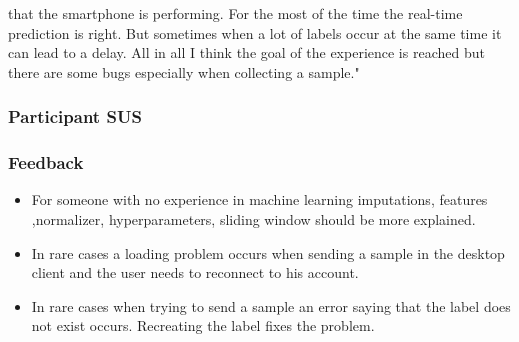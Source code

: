that the smartphone is performing. For the most of the time the real-time prediction is right. But sometimes when a lot of labels occur at the same time it can lead to a delay. All in all I think the goal of the experience is reached but there are some bugs especially when collecting a sample."

\subsubsection{Participant SUS}
\begin{table}[h]
\end{table}
\subsubsection{Feedback}
\begin{itemize}
  \item For someone with no experience in machine learning imputations, features ,normalizer, hyperparameters, sliding window should be more explained.
  \newline
  \item In rare cases a loading problem occurs when sending a sample in the desktop client and the user needs to reconnect to his account.
  \newline
  \item In rare cases when trying to send a sample an error saying that the label does not exist occurs. Recreating the label fixes the problem.
  \newline
\end{itemize}